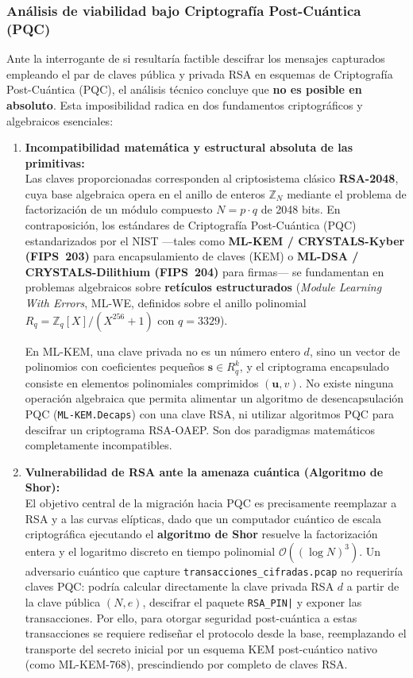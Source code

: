 \documentclass[letter,12pt]{article}
\begin{document}
\clearpage
\subsubsection{Análisis de viabilidad bajo Criptografía Post-Cuántica (PQC)}

Ante la interrogante de si resultaría factible descifrar los mensajes capturados empleando el par de claves pública y privada RSA en esquemas de Criptografía Post-Cuántica (PQC), el análisis técnico concluye que \textbf{no es posible en absoluto}. Esta imposibilidad radica en dos fundamentos criptográficos y algebraicos esenciales:

\begin{enumerate}
    \item \textbf{Incompatibilidad matemática y estructural absoluta de las primitivas:}\\
    Las claves proporcionadas corresponden al criptosistema clásico \textbf{RSA-2048}, cuya base algebraica opera en el anillo de enteros $\mathbb{Z}_N$ mediante el problema de factorización de un módulo compuesto $N = p \cdot q$ de 2048 bits. En contraposición, los estándares de Criptografía Post-Cuántica (PQC) estandarizados por el NIST —tales como \textbf{ML-KEM / CRYSTALS-Kyber (FIPS~203)} para encapsulamiento de claves (KEM) o \textbf{ML-DSA / CRYSTALS-Dilithium (FIPS~204)} para firmas— se fundamentan en problemas algebraicos sobre \textbf{retículos estructurados} (\textit{Module Learning With Errors}, ML-WE, definidos sobre el anillo polinomial $R_q = \mathbb{Z}_q[X]/(X^{256}+1)$ con $q = 3329$).
    
    En ML-KEM, una clave privada no es un número entero $d$, sino un vector de polinomios con coeficientes pequeños $\mathbf{s} \in R_q^k$, y el criptograma encapsulado consiste en elementos polinomiales comprimidos $(\mathbf{u}, v)$. No existe ninguna operación algebraica que permita alimentar un algoritmo de desencapsulación PQC (\texttt{ML-KEM.Decaps}) con una clave RSA, ni utilizar algoritmos PQC para descifrar un criptograma RSA-OAEP. Son dos paradigmas matemáticos completamente incompatibles.

    \item \textbf{Vulnerabilidad de RSA ante la amenaza cuántica (Algoritmo de Shor):}\\
    El objetivo central de la migración hacia PQC es precisamente reemplazar a RSA y a las curvas elípticas, dado que un computador cuántico de escala criptográfica ejecutando el \textbf{algoritmo de Shor} resuelve la factorización entera y el logaritmo discreto en tiempo polinomial $\mathcal{O}((\log N)^3)$. Un adversario cuántico que capture \texttt{transacciones\_cifradas.pcap} no requeriría claves PQC: podría calcular directamente la clave privada RSA $d$ a partir de la clave pública $(N, e)$, descifrar el paquete \texttt{RSA\_PIN|} y exponer las transacciones. Por ello, para otorgar seguridad post-cuántica a estas transacciones se requiere rediseñar el protocolo desde la base, reemplazando el transporte del secreto inicial por un esquema KEM post-cuántico nativo (como ML-KEM-768), prescindiendo por completo de claves RSA.
\end{enumerate}
\end{document}
